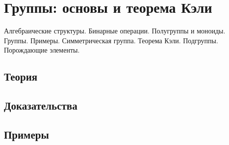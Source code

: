 
\section{Группы: основы и теорема Кэли}
\label{sec:2.2.11-groups-basics}

\begin{ticket}
Алгебраические структуры. Бинарные операции. Полугруппы и моноиды. Группы. Примеры. Симметрическая группа. Теорема Кэли. Подгруппы. Порождающие элементы.
\end{ticket}

\subsection*{Теория}

\subsection*{Доказательства}

\subsection*{Примеры}
